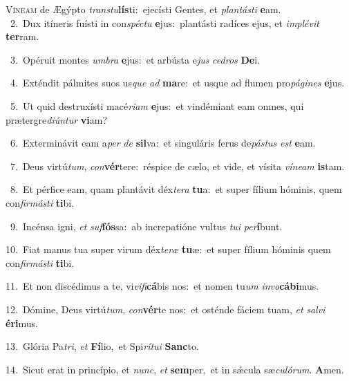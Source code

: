 \lettrine{\initial\textcolor{\initialcolor}{V}}{íneam} de Ægýpto \textit{trans}\-\textit{tu}\textbf{lís}ti:~\star ejecísti Gentes, et \textit{plan}\-\textit{tás}\textit{ti} \textbf{e}\-am.\\
{\numbfont\textcolor{\numbcolor}{~2.}}~Dux itíneris fuísti in con\-\textit{spéc}\-\textit{tu} \textbf{e}\-jus:~\star plantásti radíces ejus, et \textit{im}\-\textit{plé}\textit{vit} \textbf{ter}\-ram.\par
{\numbfont\textcolor{\numbcolor}{~3.}}~Opéruit montes \textit{um}\-\textit{bra} \textbf{e}\-jus:~\star et arbústa e\textit{jus} \textit{ce}\-\textit{dros} \textbf{De}\-i.\par
{\numbfont\textcolor{\numbcolor}{~4.}}~Exténdit pálmites suos us\textit{que} \textit{ad} \textbf{ma}\-re:~\star et usque ad flumen pro\-\textit{pá}\-\textit{gi}\textit{nes} \textbf{e}\-jus.\par
{\numbfont\textcolor{\numbcolor}{~5.}}~Ut quid destruxísti macé\-\textit{ri}\-\textit{am} \textbf{e}\-jus:~\star et vindémiant eam omnes, qui prætergre\-\textit{di}\-\textit{ún}\textit{tur} \textbf{vi}\-am?\par
{\numbfont\textcolor{\numbcolor}{~6.}}~Exterminávit eam a\textit{per} \textit{de} \textbf{sil}\-va:~\star et singuláris ferus de\-\textit{pás}\-\textit{tus} \textit{est} \textbf{e}\-am.\par
{\numbfont\textcolor{\numbcolor}{~7.}}~Deus virtú\-\textit{tum}\-, \textit{con}\-\textbf{vér}tere:~\star réspice de cælo, et vide, et vísita \textit{ví}\-\textit{ne}\textit{am} \textbf{is}\-tam.\par
{\numbfont\textcolor{\numbcolor}{~8.}}~Et pérfice eam, quam plantávit déx\-\textit{te}\-\textit{ra} \textbf{tu}\-a:~\star et super fílium hóminis, quem con\-\textit{fir}\-\textit{más}\textit{ti} \textbf{ti}\-bi.\par
{\numbfont\textcolor{\numbcolor}{~9.}}~Incénsa igni, \textit{et} \textit{suf}\-\textbf{fós}sa:~\star ab increpatióne vultus \textit{tu}\-\textit{i} \textit{per}\-\textbf{í}bunt.\par
{\numbfont\textcolor{\numbcolor}{10.}}~Fiat manus tua super virum déx\-\textit{te}\-\textit{ræ} \textbf{tu}\-æ:~\star et super fílium hóminis quem con\-\textit{fir}\-\textit{más}\textit{ti} \textbf{ti}\-bi.\par
{\numbfont\textcolor{\numbcolor}{11.}}~Et non discédimus a te, vi\-\textit{vi}\-\textit{fi}\textbf{cá}bis nos:~\star et nomen tu\textit{um} \textit{in}\-\textit{vo}\textbf{cá}\textbf{bi}mus.\par
{\numbfont\textcolor{\numbcolor}{12.}}~Dómine, Deus virtú\-\textit{tum}\-, \textit{con}\-\textbf{vér}te nos:~\star et osténde fáciem tuam, \textit{et} \textit{sal}\-\textit{vi} \textbf{é}\-\textbf{ri}mus.\par
{\numbfont\textcolor{\numbcolor}{13.}}~Glória Pa\-\textit{tri}\-, \textit{et} \textbf{Fí}\-lio,~\star et Spi\-\textit{rí}\-\textit{tu}\textit{i} \textbf{Sanc}\-to.\par
{\numbfont\textcolor{\numbcolor}{14.}}~Sicut erat in princípio, et \textit{nunc}\-, \textit{et} \textbf{sem}\-per,~\star et in sǽcula sæ\-\textit{cu}\-\textit{ló}\textit{rum}. \textbf{A}\-men.\par
